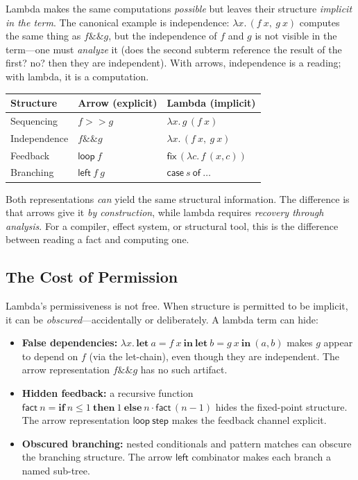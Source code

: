 \documentclass[11pt,a4paper]{article}
\theoremstyle{definition}
\theoremstyle{remark}
\newcommand{\comp}{\mathbin{>\!\!>}}
\newcommand{\leftc}{\mathsf{left}}
\newcommand{\loopop}{\mathsf{loop}}
\newcommand{\fix}{\mathsf{fix}}
\newcommand{\fanout}{\mathbin{\&\!\!\&}}
\newcommand{\lam}[2]{\lambda #1.\,#2}
\begin{document}
Lambda makes the same computations \emph{possible} but leaves their
structure \emph{implicit in the term}. The canonical example is
independence: $\lam{x}{(f\ x,\ g\ x)}$ computes the same thing as
$f \fanout g$, but the independence of $f$ and $g$ is not visible in the
term---one must \emph{analyze} it (does the second subterm reference the
result of the first? no? then they are independent). With arrows,
independence is a reading; with lambda, it is a computation.

\begin{center}
\begin{tabular}{lll}
\hline
Structure & Arrow (explicit) & Lambda (implicit) \\
\hline
Sequencing & $f \comp g$ & $\lam{x}{g\,(f\ x)}$ \\
Independence & $f \fanout g$ & $\lam{x}{(f\ x,\ g\ x)}$ \\
Feedback & $\loopop\ f$ & $\fix\,(\lam{c}{f\,(x, c)})$ \\
Branching & $\leftc\ f\ g$ & $\mathsf{case}\ s\ \mathsf{of}\ \ldots$ \\
\hline
\end{tabular}
\end{center}

Both representations \emph{can} yield the same structural information.
The difference is that arrows give it \emph{by construction}, while lambda
requires \emph{recovery through analysis}. For a compiler, effect system,
or structural tool, this is the difference between reading a fact and
computing one.

\subsection{The Cost of Permission}

Lambda's permissiveness is not free. When structure is permitted to be
implicit, it can be \emph{obscured}---accidentally or deliberately.
A lambda term can hide:

\begin{itemize}
\item \textbf{False dependencies:} $\lam{x}{\mathbf{let}\ a = f\ x\
  \mathbf{in}\ \mathbf{let}\ b = g\ x\ \mathbf{in}\ (a, b)}$ makes $g$
  appear to depend on $f$ (via the let-chain), even though they are
  independent. The arrow representation $f \fanout g$ has no such
  artifact.
\item \textbf{Hidden feedback:} a recursive function $\mathsf{fact}\ n =
  \mathbf{if}\ n \leq 1\ \mathbf{then}\ 1\ \mathbf{else}\ n \cdot
  \mathsf{fact}\,(n-1)$ hides the fixed-point structure. The arrow
  representation $\loopop\ \mathsf{step}$ makes the feedback channel
  explicit.
\item \textbf{Obscured branching:} nested conditionals and pattern
  matches can obscure the branching structure. The arrow $\leftc$
  combinator makes each branch a named sub-tree.
\end{itemize}
\end{document}
